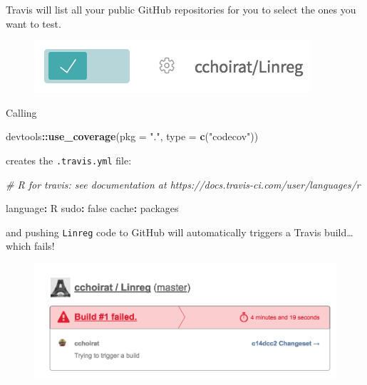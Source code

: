 \documentclass[]{book}
\newenvironment{Shaded}{\begin{snugshade}}{\end{snugshade}}
\newcommand{\KeywordTok}[1]{\textcolor[rgb]{0.13,0.29,0.53}{\textbf{#1}}}
\newcommand{\DataTypeTok}[1]{\textcolor[rgb]{0.13,0.29,0.53}{#1}}
\newcommand{\StringTok}[1]{\textcolor[rgb]{0.31,0.60,0.02}{#1}}
\newcommand{\CommentTok}[1]{\textcolor[rgb]{0.56,0.35,0.01}{\textit{#1}}}
\newcommand{\OperatorTok}[1]{\textcolor[rgb]{0.81,0.36,0.00}{\textbf{#1}}}
\newcommand{\NormalTok}[1]{#1}
\theoremstyle{definition}
\theoremstyle{definition}
\theoremstyle{definition}
\theoremstyle{remark}
\begin{document}
Travis will list all your public GitHub repositories for you to select
the ones you want to test.

\begin{figure}

{\centering \includegraphics{images/ch3_travis_Linreg} 

}

\end{figure}

Calling

\begin{Shaded}
\begin{Highlighting}[]
\NormalTok{devtools}\OperatorTok{::}\KeywordTok{use_coverage}\NormalTok{(}\DataTypeTok{pkg =} \StringTok{"."}\NormalTok{, }\DataTypeTok{type =} \KeywordTok{c}\NormalTok{(}\StringTok{"codecov"}\NormalTok{))}
\end{Highlighting}
\end{Shaded}

creates the \texttt{.travis.yml} file:

\begin{Shaded}
\begin{Highlighting}[]
\CommentTok{# R for travis: see documentation at https://docs.travis-ci.com/user/languages/r}

\NormalTok{language}\OperatorTok{:}\StringTok{ }\NormalTok{R}
\NormalTok{sudo}\OperatorTok{:}\StringTok{ }\NormalTok{false}
\NormalTok{cache}\OperatorTok{:}\StringTok{ }\NormalTok{packages}
\end{Highlighting}
\end{Shaded}

and pushing \texttt{Linreg} code to GitHub will automatically triggers a
Travis build\ldots{} which fails!

\begin{figure}

{\centering \includegraphics{images/ch3_travis_failed_build} 

}

\end{figure}
\end{document}
